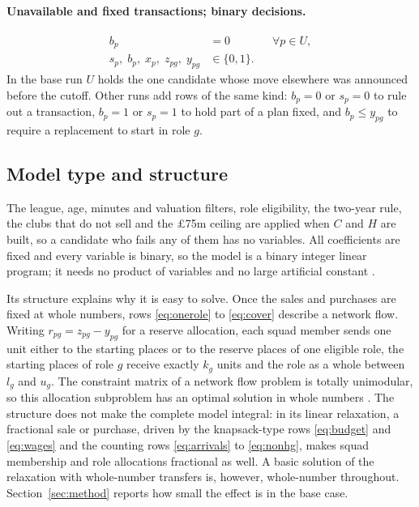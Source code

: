 \paragraph{Unavailable and fixed transactions; binary decisions.}
\begin{align}
b_p &= 0 && \forall p \in U, \label{eq:unavailable}\\
s_p,\; b_p,\; x_p,\; z_{pg},\; y_{pg} &\in \{0, 1\}. \label{eq:binary}
\end{align}
In the base run $U$ holds the one candidate whose move elsewhere was announced before the cutoff. Other runs add rows of the same kind: $b_p = 0$ or $s_p = 0$ to rule out a transaction, $b_p = 1$ or $s_p = 1$ to hold part of a plan fixed, and $b_p \le y_{pg}$ to require a replacement to start in role $g$.

\subsection{Model type and structure}\label{sec:structure}

The league, age, minutes and valuation filters, role eligibility, the two-year rule, the clubs that do not sell and the \pounds 75m ceiling are applied when $C$ and $H$ are built, so a candidate who fails any of them has no variables. All coefficients are fixed and every variable is binary, so the model is a binary integer linear program; it needs no product of variables and no large artificial constant \citep{bradley1977,hillier2001}.

Its structure explains why it is easy to solve. Once the sales and purchases are fixed at whole numbers, rows \eqref{eq:onerole} to \eqref{eq:cover} describe a network flow. Writing $r_{pg} = z_{pg} - y_{pg}$ for a reserve allocation, each squad member sends one unit either to the starting places or to the reserve places of one eligible role, the starting places of role $g$ receive exactly $k_g$ units and the role as a whole between $l_g$ and $u_g$. The constraint matrix of a network flow problem is totally unimodular, so this allocation subproblem has an optimal solution in whole numbers \citep{bertsimas1997}. The structure does not make the complete model integral: in its linear relaxation, a fractional sale or purchase, driven by the knapsack-type rows \eqref{eq:budget} and \eqref{eq:wages} and the counting rows \eqref{eq:arrivals} to \eqref{eq:nonhg}, makes squad membership and role allocations fractional as well. A basic solution of the relaxation with whole-number transfers is, however, whole-number throughout. Section~\ref{sec:method} reports how small the effect is in the base case.
